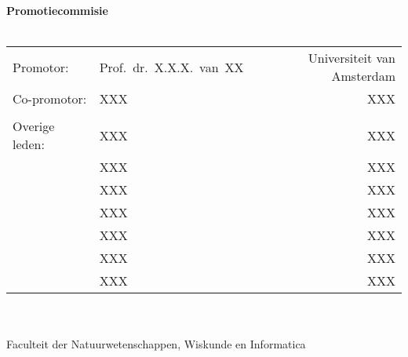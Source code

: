 {%
\clearpage
\noindent%
{\textbf{Promotiecommisie}}\\
\phantom{.} \\
\begin{tabular}[t]{@{}llr}
Promotor:      & Prof.~dr.~X.X.X.~van~XX        & Universiteit van Amsterdam \\ %
Co-promotor:   & XXX                            & XXX \\
\\
Overige leden: & XXX                            & XXX \\ %
               & XXX                            & XXX \\
               & XXX                            & XXX \\
               & XXX                            & XXX \\
               & XXX                            & XXX \\
               & XXX                            & XXX \\
               & XXX                            & XXX \\
\end{tabular}\\
\phantom{.} \\
Faculteit der Natuurwetenschappen, Wiskunde en Informatica %
\clearpage
} %


